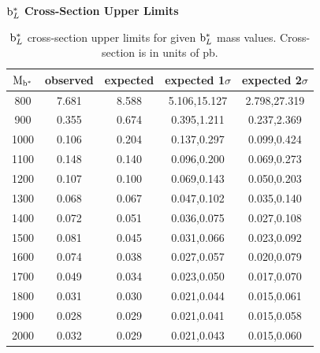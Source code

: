 \begin{table}
\begin{center}
\bf{$\mathrm{b}^{*}_L$ Cross-Section Upper Limits}\\
\begin{tabular}{c||c|c|c|c}
\hline\hline
\bf{$\mathrm{M_{\mathrm{b}^{*}}}$} & \bf{observed}  & \bf{expected} & \bf{expected 1$\sigma$}  & \bf{expected 2$\sigma$} \\
\hline
\hline
800 & 7.681 & 8.588 & 5.106,15.127 & 2.798,27.319\\ 
900 & 0.355 & 0.674 & 0.395,1.211 & 0.237,2.369\\ 
1000 & 0.106 & 0.204 & 0.137,0.297 & 0.099,0.424\\ 
1100 & 0.148 & 0.140 & 0.096,0.200 & 0.069,0.273\\ 
1200 & 0.107 & 0.100 & 0.069,0.143 & 0.050,0.203\\ 
1300 & 0.068 & 0.067 & 0.047,0.102 & 0.035,0.140\\ 
1400 & 0.072 & 0.051 & 0.036,0.075 & 0.027,0.108\\ 
1500 & 0.081 & 0.045 & 0.031,0.066 & 0.023,0.092\\ 
1600 & 0.074 & 0.038 & 0.027,0.057 & 0.020,0.079\\ 
1700 & 0.049 & 0.034 & 0.023,0.050 & 0.017,0.070\\ 
1800 & 0.031 & 0.030 & 0.021,0.044 & 0.015,0.061\\ 
1900 & 0.028 & 0.029 & 0.021,0.041 & 0.015,0.058\\ 
2000 & 0.032 & 0.029 & 0.021,0.043 & 0.015,0.060\\ 
\hline
\end{tabular}
\end{center}
\caption{$\mathrm{b}^{*}_L$ cross-section upper limits for given $\mathrm{b}^{*}_L$ mass values.  Cross-section is in units of pb.}
\label{table:bsupperxsecL}
\end{table}


